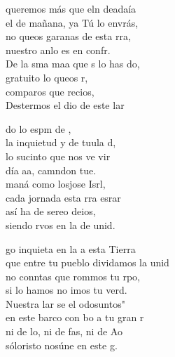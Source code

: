 \begin{cancion}%
	 queremos más que eln deadaía\\
	el de mañana, ya Tú lo envrás,\\
	no queos garanas de esta rra, \\
	nuestro anlo es en confr.\\
	\jump
	De la sma maa que s lo has do,\\
	gratuito lo queos r,\\
	comparos  que recios,\\
	Destermos el dio de este lar\jump\\
	\begin{chorus}%
		do lo espm de ,\\
		la inquietud y de tuula d,\\
		lo sucinto que nos ve vir\\
		día aa, camndon tue. \\
	\jump
		 maná como losjose Isrl,\\
		cada jornada esta rra esrar\\
		así ha de sereo deios,\\
		siendo rvos en la de  unid.\jump\\
	\end{chorus}%
	go inquieta en la a  esta Tierra\\
	que entre tu pueblo dividamos la unid\\
	no conntas que rommos tu rpo,\\
	si lo hamos no imos tu verd.\\
	\jump
	Nuestra lar se el odosuntos"\\
	en este barco con bo a tu gran r\\
	ni de lo, ni de fas, ni de Ao\\
	sóloristo nosúne en este g.\\
\end{cancion}%
